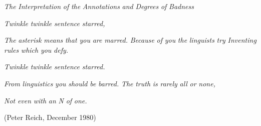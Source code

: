 \clearpage\setcounter{page}{1}\setcounter{listWWNumlviiileveli}{1}
\begin{listWWNumlviiileveli}
\item 
\setcounter{listWWNumlviiilevelii}{2}
\begin{listWWNumlviiilevelii}
\item 
\setcounter{listWWNumlviiileveliii}{3}
\begin{listWWNumlviiileveliii}
\item 
\begin{styleStandard}
\textit{The}\textit{ }\textit{Interpretation}\textit{ }\textit{of}\textit{ }\textit{the}\textit{ }\textit{Annotations}\textit{ }\textit{and}\textit{ }\textit{Degrees}\textit{ }\textit{of}\textit{ }\textit{Badness}
\end{styleStandard}


\end{listWWNumlviiileveliii}
\end{listWWNumlviiilevelii}
\end{listWWNumlviiileveli}
\begin{multicols}{2}
\begin{styleStandard}
\textit{Twinkle}\textit{ }\textit{twinkle}\textit{ }\textit{sentence}\textit{ }\textit{starred,}
\end{styleStandard}


\begin{styleStandard}
\textit{The}\textit{ }\textit{asterisk}\textit{ }\textit{means}\textit{ }\textit{that you}\textit{ }\textit{are}\textit{ }\textit{marred.}\textit{ }\textit{Because}\textit{ }\textit{of}\textit{ }\textit{you}\textit{ }\textit{the}\textit{ }\textit{linguists}\textit{ }\textit{try}\textit{ }\textit{Inventing}\textit{ }\textit{rules}\textit{ }\textit{which}\textit{ }\textit{you}\textit{ }\textit{defy.}
\end{styleStandard}


\begin{styleStandard}
\textit{Twinkle}\textit{ }\textit{twinkle}\textit{ }\textit{sentence}\textit{ }\textit{starred.}
\end{styleStandard}


\begin{styleStandard}
\textit{From}\textit{ }\textit{linguistics}\textit{ }\textit{you}\textit{ }\textit{should}\textit{ }\textit{be}\textit{ }\textit{barred.}\textit{ }\textit{The}\textit{ }\textit{truth}\textit{ }\textit{is}\textit{ }\textit{rarely}\textit{ }\textit{all}\textit{ }\textit{or}\textit{ }\textit{none,}
\end{styleStandard}


\begin{styleStandard}
\textit{Not}\textit{ }\textit{even}\textit{ }\textit{with}\textit{ }\textit{an}\textit{ }\textit{N}\textit{ }\textit{of}\textit{ }\textit{one.}
\end{styleStandard}


\begin{styleStandard}
(Peter Reich, December 1980)
\end{styleStandard}


\end{multicols}
